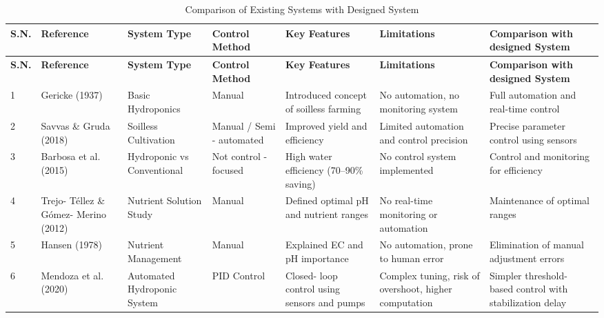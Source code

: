\renewcommand{\arraystretch}{1.4}
\setlength{\tabcolsep}{3pt}
\begin{longtable}{|
p{0.65cm}|
p{1.75cm}|
p{2.2cm}|
p{1.9cm}|
p{2.05cm}|
p{2.2cm}|
p{2.3cm}|}

\caption{Comparison of Existing Systems with Designed System} \\
\hline
\textbf{S.N.} & \textbf{Reference} & \textbf{System Type} & \textbf{Control Method} & \textbf{Key Features} & \textbf{Limitations} & \textbf{Comparison with designed System} \\
\hline
\endfirsthead

\hline
\textbf{S.N.} & \textbf{Reference} & \textbf{System Type} & \textbf{Control Method} & \textbf{Key Features} & \textbf{Limitations} & \textbf{Comparison with designed System} \\
\hline
\endhead

1 & Gericke (1937) \cite{gericke1937} & Basic Hydroponics & Manual & Introduced concept of soilless farming & No automation, no monitoring system & Full automation and real-time control \\
\hline

2 & Savvas \& Gruda (2018) \cite{savvas2018} & Soilless Cultivation & Manual / Semi - automated & Improved yield and efficiency & Limited automation and control precision & Precise parameter control using sensors \\
\hline

3 & Barbosa et al. (2015) \cite{barbosa2015} & Hydroponic vs Conventional & Not control - focused & High water efficiency (70--90\% saving) & No control system implemented & Control and monitoring for efficiency \\
\hline

4 & Trejo- Téllez \& Gómez- Merino (2012) \cite{trejo2012} & Nutrient Solution Study & Manual & Defined optimal pH and nutrient ranges & No real-time monitoring or automation & Maintenance of optimal ranges \\
\hline

5 & Hansen (1978) \cite{hansen1978}& Nutrient Management & Manual & Explained EC and pH importance & No automation, prone to human error & Elimination of manual adjustment errors \\
\hline

6 & Mendoza et al. (2020) \cite{mendoza2020} & Automated Hydroponic System & PID Control & Closed- loop control using sensors and pumps & Complex tuning, risk of overshoot, higher computation & Simpler threshold- based control with stabilization delay \\
\hline


\end{longtable}
